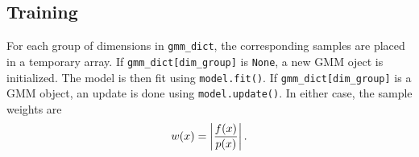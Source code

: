\documentclass{article}
\begin{document}
\subsection{Training}

For each group of dimensions in \texttt{gmm\_dict}, the corresponding samples
are placed in a temporary array. If \texttt{gmm\_dict[dim\_group]} is
\texttt{None}, a new GMM oject is initialized. The model is then fit using
\texttt{model.fit()}. If \texttt{gmm\_dict[dim\_group]} is a GMM object,
an update is done using \texttt{model.update()}. In either case, the sample
weights are
\begin{equation}
    w(x) = \left| {f(x) \over p(x)} \right|.
\end{equation}
\nocite{*}
{}

\end{document}
